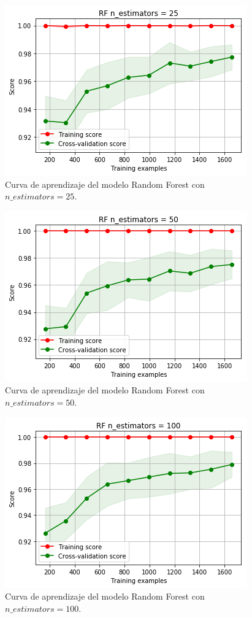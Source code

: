 \documentclass[11pt,a4paper]{article}
\begin{document}
\begin{figure}[H]
    \centering
    \includegraphics[scale=0.7]{img/lc-rf-n-25.png}
    \caption{Curva de aprendizaje del modelo Random Forest con $n\_estimators=25$.}
    \label{fig:lc-rf-n-25}
\end{figure}

\begin{figure}[H]
    \centering
    \includegraphics[scale=0.7]{img/lc-rf-n-50.png}
    \caption{Curva de aprendizaje del modelo Random Forest con $n\_estimators=50$.}
    \label{fig:lc-rf-n-50}
\end{figure}

\begin{figure}[H]
    \centering
    \includegraphics[scale=0.7]{img/lc-rf-n-100.png}
    \caption{Curva de aprendizaje del modelo Random Forest con $n\_estimators=100$.}
    \label{fig:lc-rf-n-100}
\end{figure}
\end{document}
